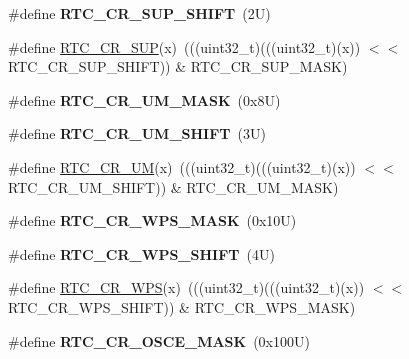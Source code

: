 \begin{DoxyCompactItemize}
\#define {\bfseries R\+T\+C\+\_\+\+C\+R\+\_\+\+S\+U\+P\+\_\+\+S\+H\+I\+FT}~(2\+U)
\item 
\#define \mbox{\hyperlink{group___r_t_c___register___masks_ga77d71ad1346f9dce80d00209745c3d6a}{R\+T\+C\+\_\+\+C\+R\+\_\+\+S\+UP}}(x)~(((uint32\+\_\+t)(((uint32\+\_\+t)(x)) $<$$<$ R\+T\+C\+\_\+\+C\+R\+\_\+\+S\+U\+P\+\_\+\+S\+H\+I\+FT)) \& R\+T\+C\+\_\+\+C\+R\+\_\+\+S\+U\+P\+\_\+\+M\+A\+SK)
\item 
\mbox{\label{group___r_t_c___register___masks_gae071fafa245264dd485258198b7fcf8a}} 
\#define {\bfseries R\+T\+C\+\_\+\+C\+R\+\_\+\+U\+M\+\_\+\+M\+A\+SK}~(0x8\+U)
\item 
\mbox{\label{group___r_t_c___register___masks_ga71fb55b262a9f0aac1777b4115a1bfa7}} 
\#define {\bfseries R\+T\+C\+\_\+\+C\+R\+\_\+\+U\+M\+\_\+\+S\+H\+I\+FT}~(3\+U)
\item 
\#define \mbox{\hyperlink{group___r_t_c___register___masks_gab5d567fd2b557c6cd3568c1713b19709}{R\+T\+C\+\_\+\+C\+R\+\_\+\+UM}}(x)~(((uint32\+\_\+t)(((uint32\+\_\+t)(x)) $<$$<$ R\+T\+C\+\_\+\+C\+R\+\_\+\+U\+M\+\_\+\+S\+H\+I\+FT)) \& R\+T\+C\+\_\+\+C\+R\+\_\+\+U\+M\+\_\+\+M\+A\+SK)
\item 
\mbox{\label{group___r_t_c___register___masks_gaf48371b4fd174e8652b2a970c68369f6}} 
\#define {\bfseries R\+T\+C\+\_\+\+C\+R\+\_\+\+W\+P\+S\+\_\+\+M\+A\+SK}~(0x10\+U)
\item 
\mbox{\label{group___r_t_c___register___masks_ga38c5d95b9794b935b221c298307efe2c}} 
\#define {\bfseries R\+T\+C\+\_\+\+C\+R\+\_\+\+W\+P\+S\+\_\+\+S\+H\+I\+FT}~(4\+U)
\item 
\#define \mbox{\hyperlink{group___r_t_c___register___masks_ga524b9e5ac1abfe638c018b002ccbea70}{R\+T\+C\+\_\+\+C\+R\+\_\+\+W\+PS}}(x)~(((uint32\+\_\+t)(((uint32\+\_\+t)(x)) $<$$<$ R\+T\+C\+\_\+\+C\+R\+\_\+\+W\+P\+S\+\_\+\+S\+H\+I\+FT)) \& R\+T\+C\+\_\+\+C\+R\+\_\+\+W\+P\+S\+\_\+\+M\+A\+SK)
\item 
\mbox{\label{group___r_t_c___register___masks_ga1517078d0ce615b7feb94ef57b28e4c8}} 
\#define {\bfseries R\+T\+C\+\_\+\+C\+R\+\_\+\+O\+S\+C\+E\+\_\+\+M\+A\+SK}~(0x100\+U)
\item 
\mbox{\label{group___r_t_c___register___masks_ga9d52da825519dde1888921fb1b5e096d}} 
$$
\end{DoxyCompactItemize}
